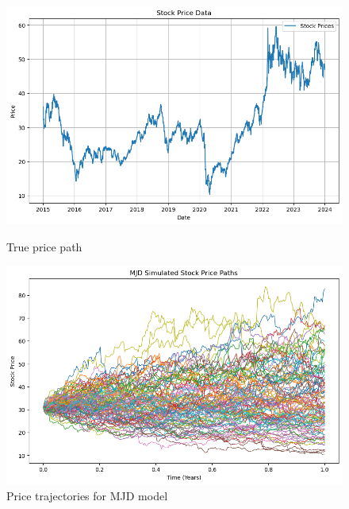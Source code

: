 \documentclass[12pt]{article}
\numberwithin{equation}{section}
\begin{document}
\begin{figure}[h!]
    \centering
    \begin{minipage}{0.48\textwidth}
        \centering
        \includegraphics[width=\linewidth]{realpricepath.png}
        \caption{True price path}
        \label{fig:realpricepath}
    \end{minipage}
    \hfill
    \begin{minipage}{0.48\textwidth}
        \centering
        \includegraphics[width=\linewidth]{mjdpricepath.png}
        \caption{Price trajectories for MJD model}
        \label{fig:mjdpricepath}
    \end{minipage}
\end{figure}
\end{document}
